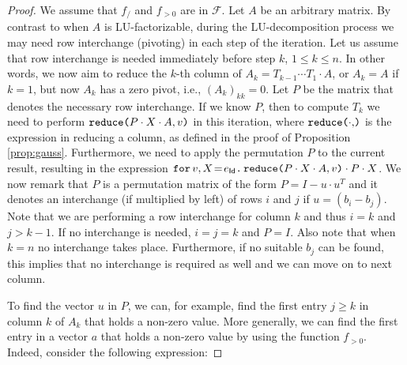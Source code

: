 \begin{proof}

    We assume that $f_{/}$ and $f_{>0}$ are in $\mathcal{F}$. Let $A$ be an arbitrary matrix.
    By contrast to when $A$ is LU-factorizable, during the LU-decomposition process we may need row interchange (pivoting) in each step of the iteration. Let us assume that row interchange is needed immediately before 
    step $k$, $1\leq k\leq n$. In other words, we now aim to reduce the $k$-th column of $A_k=T_{k-1}\cdots T_1\cdot A$, 
    or $A_k=A$ if $k=1$, but now $A_k$ has a zero pivot, i.e., $(A_{k})_{kk}=0$. 
    Let $P$ be the matrix that denotes the necessary row interchange. If we know
    $P$, then 
    to compute $T_k$ we need to perform $\red{P\cdot X\cdot A}{v}$ in this iteration,
    where $\red{\cdot}$ is the expression in \langfor reducing a column, as defined in the proof of Proposition \ref{prop:gauss}.
    Furthermore, we need to apply the permutation $P$ to the current result, resulting in the 
    expression $\initf{e_{\mathsf{Id}}}{v}{X}{\red{P\cdot X\cdot A}{v}\cdot P\cdot X}$. We now remark that
    $P$ is a permutation matrix of the  form $P = I - u\cdot u^T$ and it denotes an interchange (if multiplied by left) of rows $i$ and $j$ if $u=(b_{i}-b_{j})$. Note that we are performing a row interchange for column $k$ and thus $i=k$ and $j>k-1$. If no interchange is needed, $i=j=k$ and $P=I$.
    Also note that when $k=n$ no interchange takes place. Furthermore, if no suitable $b_j$ can
    be found, this implies that no interchange is required as well and we can move on to next column.

    To find the vector $u$ in $P$, we can, for example, find the first entry $j\geq k$ in column $k$ of $A_k$ that holds a non-zero value. More generally, we can find the first entry in a vector $a$ that holds a non-zero value by using the function $f_{>0}$. Indeed, consider the following expression:


\end{proof}
